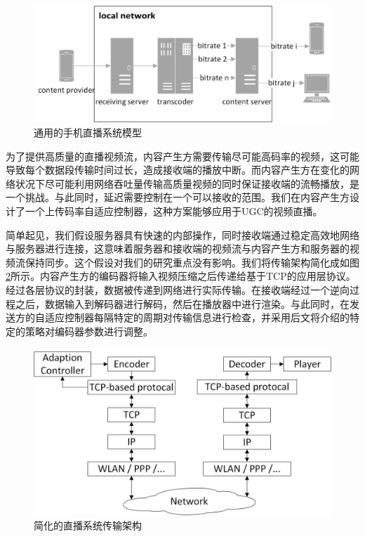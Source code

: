 \begin{figure}[h]
	\centering
	\includegraphics[width = 0.9\linewidth]{clip/07.png}
	\caption{通用的手机直播系统模型\label{fig:07}}
\end{figure}

为了提供高质量的直播视频流，内容产生方需要传输尽可能高码率的视频，这可能导致每个数据段传输时间过长，造成接收端的播放中断。而内容产生方在变化的网络状况下尽可能利用网络吞吐量传输高质量视频的同时保证接收端的流畅播放，是一个挑战。与此同时，延迟需要控制在一个可以接收的范围。我们在内容产生方设计了一个上传码率自适应控制器，这种方案能够应用于UGC的视频直播。

简单起见，我们假设服务器具有快速的内部操作，同时接收端通过稳定高效地网络与服务器进行连接，这意味着服务器和接收端的视频流与内容产生方和服务器的视频流保持同步。这个假设对我们的研究重点没有影响。我们将传输架构简化成如图\ref{fig:08}所示。内容产生方的编码器将输入视频压缩之后传递给基于TCP的应用层协议。经过各层协议的封装，数据被传递到网络进行实际传输。在接收端经过一个逆向过程之后，数据输入到解码器进行解码，然后在播放器中进行渲染。与此同时，在发送方的自适应控制器每隔特定的周期对传输信息进行检查，并采用后文将介绍的特定的策略对编码器参数进行调整。

\begin{figure}[h]
	\centering
	\includegraphics[width = 0.9\linewidth]{clip/08.png}
	\caption{简化的直播系统传输架构\label{fig:08}}
\end{figure}

